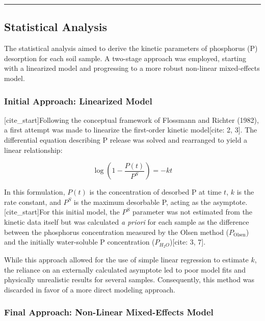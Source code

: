 \documentclass[
  letterpaper,
  DIV=11,
  numbers=noendperiod]{scrartcl}
\begin{document}
\begin{center}\rule{0.5\linewidth}{0.5pt}\end{center}

\subsection{Statistical Analysis}\label{statistical-analysis}

The statistical analysis aimed to derive the kinetic parameters of
phosphorus (P) desorption for each soil sample. A two-stage approach was
employed, starting with a linearized model and progressing to a more
robust non-linear mixed-effects model.

\subsubsection{Initial Approach: Linearized
Model}\label{initial-approach-linearized-model}

{[}cite\_start{]}Following the conceptual framework of Flossmann and
Richter (1982), a first attempt was made to linearize the first-order
kinetic model{[}cite: 2, 3{]}. The differential equation describing P
release was solved and rearranged to yield a linear relationship:

\[ \log\left(1 - \frac{P(t)}{P^S}\right) = -kt \]

In this formulation, \(P(t)\) is the concentration of desorbed P at time
\(t\), \(k\) is the rate constant, and \(P^S\) is the maximum desorbable
P, acting as the asymptote. {[}cite\_start{]}For this initial model, the
\(P^S\) parameter was not estimated from the kinetic data itself but was
calculated \emph{a priori} for each sample as the difference between the
phosphorus concentration measured by the Olsen method
(\(P_\text{Olsen}\)) and the initially water-soluble P concentration
(\(P_{H_2O}\)){[}cite: 3, 7{]}.

While this approach allowed for the use of simple linear regression to
estimate \(k\), the reliance on an externally calculated asymptote led
to poor model fits and physically unrealistic results for several
samples. Consequently, this method was discarded in favor of a more
direct modeling approach.

\subsubsection{Final Approach: Non-Linear Mixed-Effects
Model}\label{final-approach-non-linear-mixed-effects-model}
\end{document}

